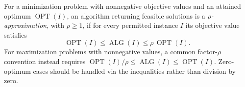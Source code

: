 
For a minimization problem with nonnegative objective values and an attained optimum $\operatorname{OPT}(I)$, an algorithm returning feasible solutions is a \emph{$\rho$-approximation}, with $\rho\ge1$, if for every permitted instance $I$ its objective value satisfies
\[
\operatorname{OPT}(I)\le \operatorname{ALG}(I)\le \rho\,\operatorname{OPT}(I).
\]
For maximization problems with nonnegative values, a common factor-$\rho$ convention instead requires $\operatorname{OPT}(I)/\rho\le\operatorname{ALG}(I)\le\operatorname{OPT}(I)$. Zero-optimum cases should be handled via the inequalities rather than division by zero.

